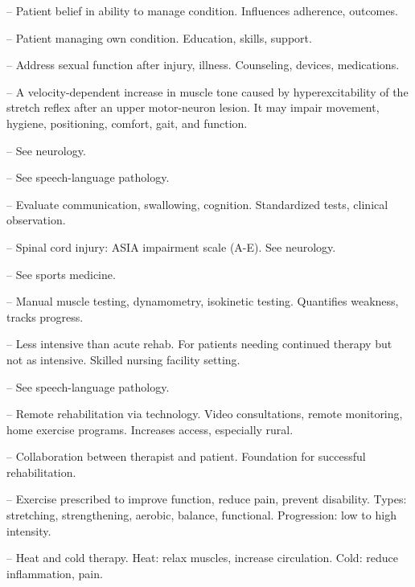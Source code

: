 -- Patient belief in ability to manage condition. Influences adherence, outcomes.

-- Patient managing own condition. Education, skills, support.

-- Address sexual function after injury, illness. Counseling, devices, medications.

-- A velocity-dependent increase in muscle tone caused by hyperexcitability of the stretch reflex after an upper motor-neuron lesion. It may impair movement, hygiene, positioning, comfort, gait, and function.

-- See neurology.

-- See speech-language pathology.

-- Evaluate communication, swallowing, cognition. Standardized tests, clinical observation.

-- Spinal cord injury: ASIA impairment scale (A-E). See neurology.



-- See sports medicine.

-- Manual muscle testing, dynamometry, isokinetic testing. Quantifies weakness, tracks progress.

-- Less intensive than acute rehab. For patients needing continued therapy but not as intensive. Skilled nursing facility setting.



-- See speech-language pathology.

-- Remote rehabilitation via technology. Video consultations, remote monitoring, home exercise programs. Increases access, especially rural.

-- Collaboration between therapist and patient. Foundation for successful rehabilitation.

-- Exercise prescribed to improve function, reduce pain, prevent disability. Types: stretching, strengthening, aerobic, balance, functional. Progression: low to high intensity.

-- Heat and cold therapy. Heat: relax muscles, increase circulation. Cold: reduce inflammation, pain.

